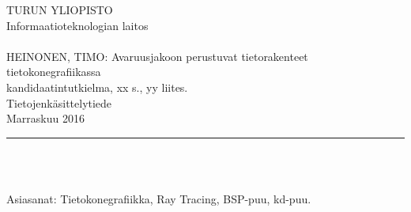 

\setlength{\hoffset}{-1in} \setlength{\oddsidemargin}{4cm} \addtolength{\textwidth}{1.3cm} \addtolength{\textheight}{1cm} \setlength{\voffset}{-1in}

\thispagestyle{empty}  %

\noindent
TURUN YLIOPISTO\\
Informaatioteknologian laitos\\
\\
HEINONEN, TIMO: Avaruusjakoon perustuvat tietorakenteet tietokonegrafiikassa\\
kandidaatintutkielma, xx s., yy liites.\\
Tietojenkäsittelytiede\\
Marraskuu 2016\\
\rule{\textwidth}{.2mm}\\
\\
\vspace{4mm}%
\vspace{4mm}
\vspace{4mm}

\vspace{4mm}Asiasanat: Tietokonegrafiikka, Ray Tracing, BSP-puu, kd-puu.

